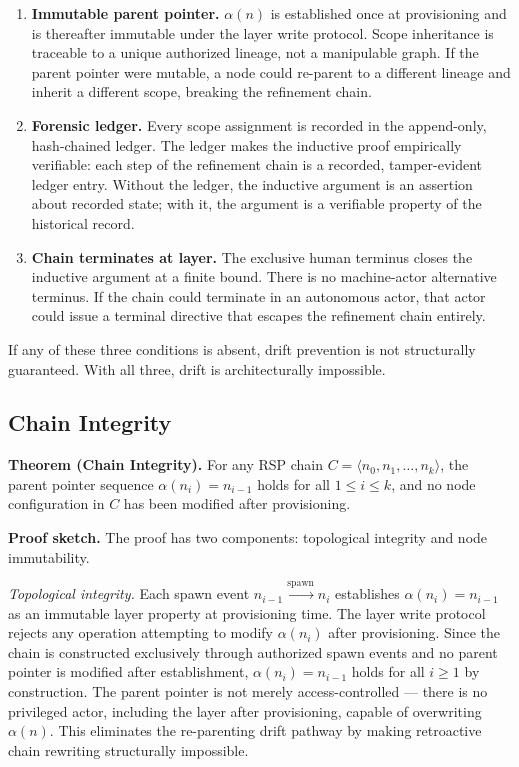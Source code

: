 \begin{enumerate}
    \item[(1)] \textbf{Immutable parent pointer.} $\alpha(n)$ is established once at provisioning and is thereafter immutable under the \fact{} layer write protocol. Scope inheritance is traceable to a unique authorized lineage, not a manipulable graph. If the parent pointer were mutable, a node could re-parent to a different lineage and inherit a different scope, breaking the refinement chain.
    \item[(2)] \textbf{Forensic ledger.} Every scope assignment is recorded in the append-only, hash-chained ledger. The ledger makes the inductive proof empirically verifiable: each step of the refinement chain is a recorded, tamper-evident ledger entry. Without the ledger, the inductive argument is an assertion about recorded state; with it, the argument is a verifiable property of the historical record.
    \item[(3)] \textbf{Chain terminates at \purpose{} layer.} The exclusive human terminus closes the inductive argument at a finite bound. There is no machine-actor alternative terminus. If the chain could terminate in an autonomous actor, that actor could issue a terminal directive that escapes the refinement chain entirely.
\end{enumerate}

If any of these three conditions is absent, drift prevention is not structurally guaranteed. With all three, drift is architecturally impossible.

\subsection{Chain Integrity}
\label{sec:chain_integrity}

\medskip
\noindent\textbf{Theorem (Chain Integrity).} For any RSP chain $C = \langle n_0, n_1, \ldots, n_k \rangle$, the parent pointer sequence $\alpha(n_i) = n_{i-1}$ holds for all $1 \leq i \leq k$, and no node configuration in $C$ has been modified after provisioning.

\medskip
\noindent\textbf{Proof sketch.} The proof has two components: topological integrity and node immutability.

\medskip
\textit{Topological integrity.} Each spawn event $n_{i-1} \xrightarrow{\mathrm{spawn}} n_i$ establishes $\alpha(n_i) = n_{i-1}$ as an immutable \fact{} layer property at provisioning time. The \fact{} layer write protocol rejects any operation attempting to modify $\alpha(n_i)$ after provisioning. Since the chain is constructed exclusively through authorized spawn events and no parent pointer is modified after establishment, $\alpha(n_i) = n_{i-1}$ holds for all $i \geq 1$ by construction. The parent pointer is not merely access-controlled --- there is no privileged actor, including the \purpose{} layer after provisioning, capable of overwriting $\alpha(n)$. This eliminates the re-parenting drift pathway by making retroactive chain rewriting structurally impossible.

